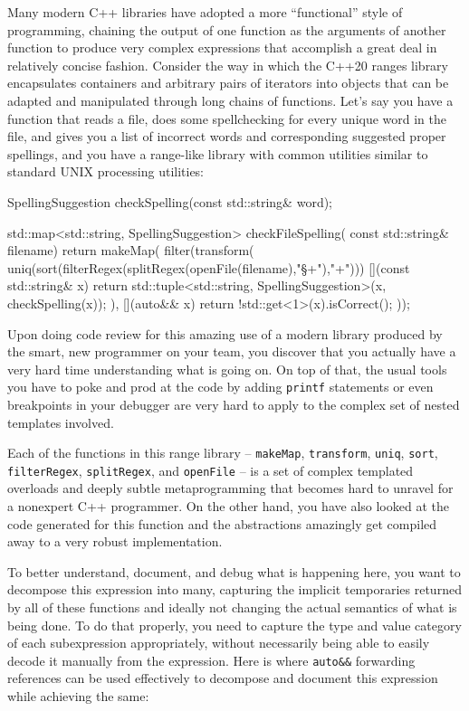Many modern C++ libraries have adopted a more ``functional'' style of
programming, chaining the output of one function as the arguments of
another function to produce very complex expressions that accomplish a
great deal in relatively concise fashion. Consider the way in which the
C++20 ranges library encapsulates containers and arbitrary pairs of
iterators into objects that can be adapted and manipulated through long
chains of functions. Let's say you have a function that reads a file,
does some spellchecking for every unique word in the file, and gives you a
list of incorrect words and corresponding suggested proper spellings,
and you have a range-like library with common utilities similar to
standard UNIX processing utilities:

\begin{emcppslisting}
SpellingSuggestion checkSpelling(const std::string& word);

std::map<std::string, SpellingSuggestion> checkFileSpelling(
                                                   const std::string& filename)
{
    return makeMap(
        filter(transform(
            uniq(sort(filterRegex(splitRegex(openFile(filename),"\S+"),"\w+")))
        [](const std::string& x)
        {
            return std::tuple<std::string, SpellingSuggestion>(x,
                                                             checkSpelling(x));
        }
   ), [](auto&& x) { return !std::get<1>(x).isCorrect(); }));
}
\end{emcppslisting}

\noindent Upon doing code review for this amazing use of a modern library produced
by the smart, new programmer on your team, you discover that you actually
have a very hard time understanding what is going on. On top of that,
the usual tools you have to poke and prod at the code by adding
\texttt{printf} statements or even breakpoints in your debugger are very
hard to apply to the complex set of nested templates involved.

Each of the functions in this range library -- \texttt{makeMap},
\texttt{transform}, \texttt{uniq}, \texttt{sort}, \texttt{filterRegex},
\texttt{splitRegex}, and \texttt{openFile} -- is a set of complex
templated overloads and deeply subtle metaprogramming that becomes hard
to unravel for a nonexpert C++ programmer. On the other hand, you have
also looked at the code generated for this function and the abstractions
amazingly get compiled away to a very robust implementation.

To better understand, document, and debug what is happening
here, you want to decompose this expression into many, capturing the
implicit temporaries returned by all of these functions and ideally not
changing the actual semantics of what is being done. To do that
properly, you need to capture the type and value category of each
subexpression appropriately, without necessarily being able to easily
decode it manually from the expression. Here is where \texttt{auto\&\&}
forwarding references can be used effectively to decompose and document
this expression while achieving the same:


